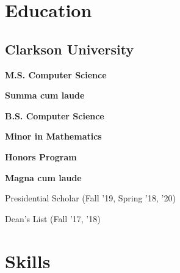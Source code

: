 \documentclass[]{deedy-resume-reversed}
\begin{document}
\begin{minipage}[t]{0.29\textwidth}

\section{Education}

\subsection{Clarkson University}
\vspace{2mm}
\color{subheadings}\fontsize{12pt}{12pt}\selectfont\bfseries{M.S. Computer Science}

\vspace{3mm}
\begin{tightemize}
\item \textbf{Summa cum laude}
\end{tightemize}
\vspace{2mm}

\color{subheadings}\fontsize{12pt}{12pt}\selectfont\bfseries{B.S. Computer Science} 

\color{subheadings}\fontsize{12pt}{12pt}\selectfont\bfseries{Minor in Mathematics} 

\begin{tightemize}
\item \textbf{Honors Program}%
\item \textbf{Magna cum laude}
\item Presidential Scholar (Fall '19, Spring '18, '20)
\item Dean's List (Fall '17, '18)
\end{tightemize}
\sectionsep

\section{Skills}


\end{minipage}
\end{document}
